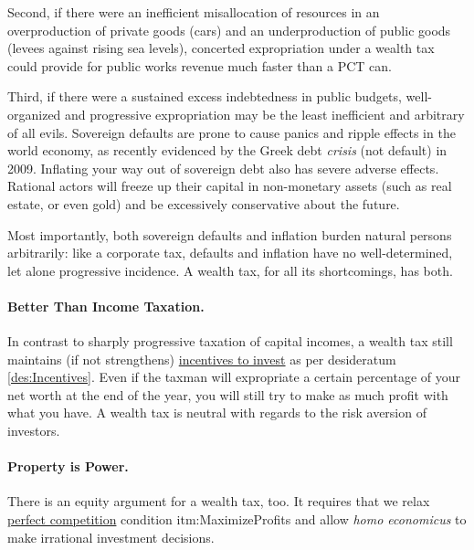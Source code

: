 Second, if there were an inefficient misallocation of resources in an overproduction of private goods (cars) and an underproduction of public goods (levees against rising sea levels), concerted expropriation under a wealth tax could provide for public works revenue much faster than a PCT can.

Third, if there were a sustained excess indebtedness in public budgets, well-organized and progressive expropriation may be the least inefficient and arbitrary of all evils.
Sovereign defaults are prone to cause panics and ripple effects in the world economy, as recently evidenced by the Greek debt \emph{crisis} (not default) in 2009.
Inflating your way out of sovereign debt also has severe adverse effects.
Rational actors will freeze up their capital in non-monetary assets (such as real estate, or even gold) and be excessively conservative about the future.

Most importantly, both sovereign defaults and inflation burden natural persons arbitrarily:
like a corporate tax, defaults and inflation have no well-determined, let alone progressive incidence.
A wealth tax, for all its shortcomings, has both.

\paragraph{Better Than Income Taxation.}
In contrast to sharply progressive taxation of capital incomes, a wealth tax still maintains (if not strengthens) \hyperref[des:Incentives]{incentives to invest} as per desideratum \ref{des:Incentives}.
Even if the taxman will expropriate a certain percentage of your net worth at the end of the year, you will still try to make as much profit with what you have.
A wealth tax is neutral with regards to the risk aversion of investors.

\paragraph{Property is Power.}
There is an equity argument for a wealth tax, too.
It requires that we relax \hyperref[sec:perfect-competition]{perfect competition} condition {itm:MaximizeProfits} and allow \emph{homo economicus} to make irrational investment decisions.


